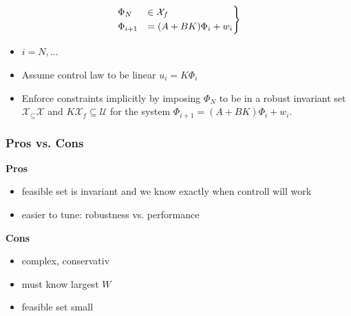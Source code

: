      \begin{minipage}{0.23\linewidth}
        \begin{align*}
        \begin{rcases}
            \Phi_N &\in \mathcal{X}_f\\
            \Phi_{i+1} &= (A+BK)\Phi _i+w_i
        \end{rcases}
        \end{align*}
    \end{minipage}
    \begin{minipage}{0.5\linewidth}
         \begin{itemize}
             \item $i=N,\dots$
             \item Assume control law to be linear $u_i=K\Phi_i$
             \item Enforce constraints implicitly by imposing $\Phi_N$ to be in a robust invariant set $\mathcal{X}_\subseteq \mathcal{X}$ and $K\mathcal{X}_f \subseteq\mathcal{U}$ for the system $\Phi_{i+1} = (A+BK)\Phi_i+w_i$.
         \end{itemize}
    \end{minipage}
    \subsubsection{Pros vs. Cons}
\begin{minipage}[t]{0.65\linewidth}
\textbf{Pros} 
\begin{itemize}
    \item feasible set is invariant and we know exactly when controll will work 
    \item easier to tune: robustness vs. performance
\end{itemize}
\end{minipage}
\begin{minipage}[t]{0.3\linewidth}
\textbf{Cons}
\begin{itemize}
    \item complex, conservativ
    \item must know largest $W$
    \item feasible set small
    \end{itemize}
\end{minipage}
